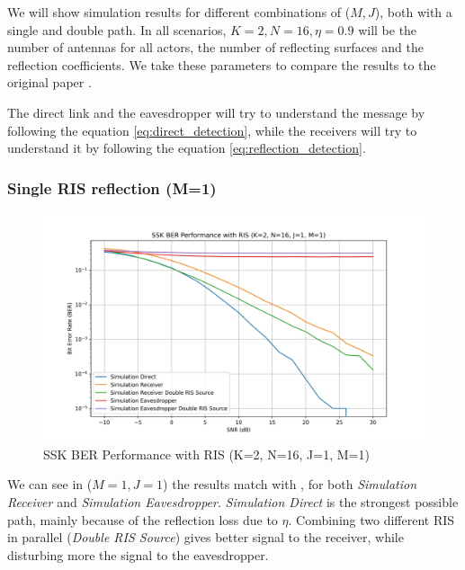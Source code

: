 We will show simulation results for different combinations of ($M, J$), both with a single and double path. In all scenarios, $K = 2, N = 16, \eta = 0.9$ will be the number of antennas for all actors, the number of reflecting surfaces and the reflection coefficients. We take these parameters to compare the results to the original paper \cite{9328149}.

The direct link and the eavesdropper will try to understand the message by following the equation \eqref{eq:direct_detection}, while the receivers will try to understand it by following the equation \eqref{eq:reflection_detection}.

\subsubsection{Single RIS reflection (M=1)}

\begin{figure}[H]
  \centering
  \includegraphics[width=\linewidth]{imgs/ber-simulations/SSK BER Performance with RIS (K=2, N=16, J=1, M=1).png}
  \caption{SSK BER Performance with RIS (K=2, N=16, J=1, M=1)}
  \label{fig:simulation_j1_m1}
\end{figure}

We can see in ($M=1, J=1$) the results match with \cite{9328149}, for both \textit{Simulation Receiver} and \textit{Simulation Eavesdropper}.
\textit{Simulation Direct} is the strongest possible path, mainly because of the reflection loss due to $\eta$.
Combining two different RIS in parallel (\textit{Double RIS Source}) gives better signal to the receiver, while disturbing more the signal to the eavesdropper.

